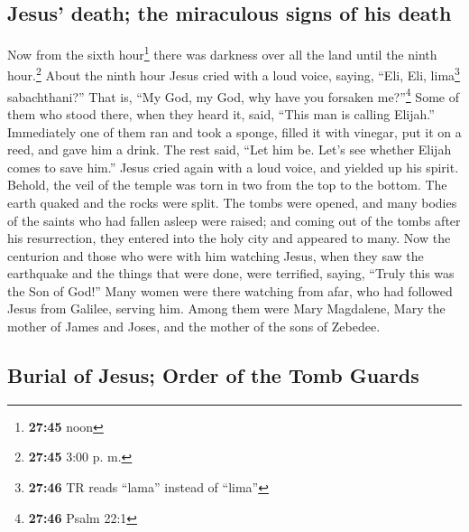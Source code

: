 \hypertarget{jesus-death-the-miraculous-signs-of-his-death}{%
\subsection{Jesus' death; the miraculous signs of his
death}\label{jesus-death-the-miraculous-signs-of-his-death}}

 Now from the sixth hour\footnote{\textbf{27:45} noon}
there was darkness over all the land until the ninth hour.\footnote{\textbf{27:45}
  3:00 p. m.}  About the ninth hour Jesus cried with a
loud voice, saying, ``Eli, Eli, lima\footnote{\textbf{27:46} TR reads
  ``lama'' instead of ``lima''} sabachthani?'' That is, ``My God, my
God, why have you forsaken me?''\footnote{\textbf{27:46} Psalm 22:1}
 Some of them who stood there, when they heard it, said,
``This man is calling Elijah.''  Immediately one of them
ran and took a sponge, filled it with vinegar, put it on a reed, and
gave him a drink.  The rest said, ``Let him be. Let's see
whether Elijah comes to save him.''  Jesus cried again
with a loud voice, and yielded up his spirit.  Behold,
the veil of the temple was torn in two from the top to the bottom. The
earth quaked and the rocks were split.  The tombs were
opened, and many bodies of the saints who had fallen asleep were raised;
 and coming out of the tombs after his resurrection, they
entered into the holy city and appeared to many.  Now the
centurion and those who were with him watching Jesus, when they saw the
earthquake and the things that were done, were terrified, saying,
``Truly this was the Son of God!''  Many women were there
watching from afar, who had followed Jesus from Galilee, serving him.
 Among them were Mary Magdalene, Mary the mother of James
and Joses, and the mother of the sons of Zebedee.

\hypertarget{burial-of-jesus-order-of-the-tomb-guards}{%
\subsection{Burial of Jesus; Order of the Tomb
Guards}\label{burial-of-jesus-order-of-the-tomb-guards}}

